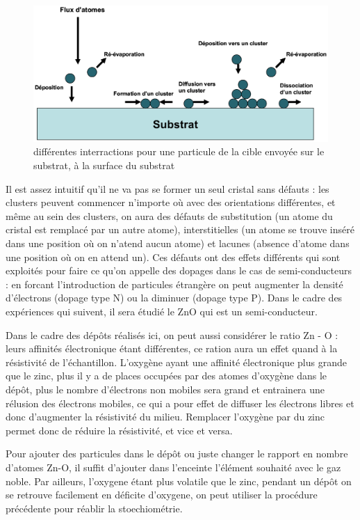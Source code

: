 \documentclass[a4paper,12pt,oneside]{article}
\begin{document}
\begin{figure}[h!]
	\begin{center}
	\includegraphics[width=1.\linewidth,angle=0]{./figures/illustration_depot2.png}
	\caption{différentes interractions pour une particule de la cible envoyée sur le substrat, à la surface du substrat} \label{fig:illustration_depot2}
	\end{center}
\end{figure}

Il est assez intuitif qu'il ne va pas se former un seul cristal sans défauts : les clusters peuvent commencer n'importe où avec des orientations différentes, et même au sein des clusters, on aura des défauts de substitution (un atome du cristal est remplacé par un autre atome), interstitielles (un atome se trouve inséré dans une position où on n'atend aucun atome) et lacunes (absence d'atome dans une position où on en attend un). Ces défauts ont des effets différents qui sont exploités pour faire ce qu'on appelle des dopages dans le cas de semi-conducteurs : en forcant l'introduction de particules étrangère on peut augmenter la densité d'électrons (dopage type N) ou la diminuer (dopage type P). Dans le cadre des expériences qui suivent, il sera étudié le ZnO qui est un semi-conducteur.


Dans le cadre des dépôts réalisés ici, on peut aussi considérer le ratio Zn - O : leurs affinités électronique étant différentes, ce ration aura un effet quand à la résistivité de l'échantillon. L'oxygène ayant une affinité électronique plus grande que le zinc, plus il y a de places occupées par des atomes d'oxygène dans le dépôt, plus le nombre d'électrons non mobiles sera grand et entrainera une rélusion des électrons mobiles, ce qui a pour effet de diffuser les électrons libres et donc d'augmenter la résistivité du milieu. Remplacer l'oxygène par du zinc permet donc de réduire la résistivité, et vice et versa.

Pour ajouter des particules dans le dépôt ou juste changer le rapport en nombre d'atomes Zn-O, il suffit d'ajouter dans l'enceinte l'élément souhaité avec le gaz noble. Par ailleurs, l'oxygene étant plus volatile que le zinc, pendant un dépôt on se retrouve facilement en déficite d'oxygene, on peut utiliser la procédure précédente pour réablir la stoechiométrie.
\end{document}
